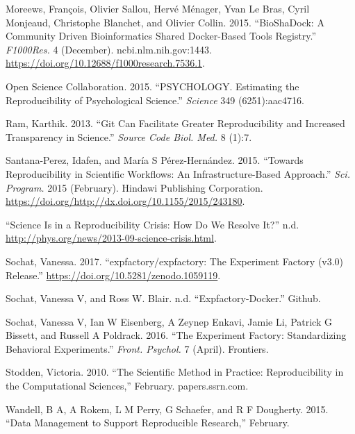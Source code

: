 \documentclass[10pt,a4paper,onecolumn]{article}
\begin{document}
\leavevmode\hypertarget{ref-Moreews2015-dy}{}%
Moreews, François, Olivier Sallou, Hervé Ménager, Yvan Le Bras, Cyril
Monjeaud, Christophe Blanchet, and Olivier Collin. 2015. ``BioShaDock: A
Community Driven Bioinformatics Shared Docker-Based Tools Registry.''
\emph{F1000Res.} 4 (December). ncbi.nlm.nih.gov:1443.
\url{https://doi.org/10.12688/f1000research.7536.1}.

\leavevmode\hypertarget{ref-Open_Science_Collaboration2015-hb}{}%
Open Science Collaboration. 2015. ``PSYCHOLOGY. Estimating the
Reproducibility of Psychological Science.'' \emph{Science} 349
(6251):aac4716.

\leavevmode\hypertarget{ref-Ram2013-km}{}%
Ram, Karthik. 2013. ``Git Can Facilitate Greater Reproducibility and
Increased Transparency in Science.'' \emph{Source Code Biol. Med.} 8
(1):7.

\leavevmode\hypertarget{ref-Santana-Perez2015-wo}{}%
Santana-Perez, Idafen, and María S Pérez-Hernández. 2015. ``Towards
Reproducibility in Scientific Workflows: An Infrastructure-Based
Approach.'' \emph{Sci. Program.} 2015 (February). Hindawi Publishing
Corporation.
\url{https://doi.org/http://dx.doi.org/10.1155/2015/243180}.

\leavevmode\hypertarget{ref-noauthor_undated-sn}{}%
``Science Is in a Reproducibility Crisis: How Do We Resolve It?'' n.d.
\url{http://phys.org/news/2013-09-science-crisis.html}.

\leavevmode\hypertarget{ref-vanessa_sochat_2017_1059119}{}%
Sochat, Vanessa. 2017. ``expfactory/expfactory: The Experiment Factory
(v3.0) Release.'' \url{https://doi.org/10.5281/zenodo.1059119}.

\leavevmode\hypertarget{ref-noauthor_undated-pi}{}%
Sochat, Vanessa V, and Ross W. Blair. n.d. ``Expfactory-Docker.''
Github.

\leavevmode\hypertarget{ref-Sochat2016-pu}{}%
Sochat, Vanessa V, Ian W Eisenberg, A Zeynep Enkavi, Jamie Li, Patrick G
Bissett, and Russell A Poldrack. 2016. ``The Experiment Factory:
Standardizing Behavioral Experiments.'' \emph{Front. Psychol.} 7
(April). Frontiers.

\leavevmode\hypertarget{ref-Stodden2010-cu}{}%
Stodden, Victoria. 2010. ``The Scientific Method in Practice:
Reproducibility in the Computational Sciences,'' February.
papers.ssrn.com.

\leavevmode\hypertarget{ref-Wandell2015-yt}{}%
Wandell, B A, A Rokem, L M Perry, G Schaefer, and R F Dougherty. 2015.
``Data Management to Support Reproducible Research,'' February.
\end{document}
